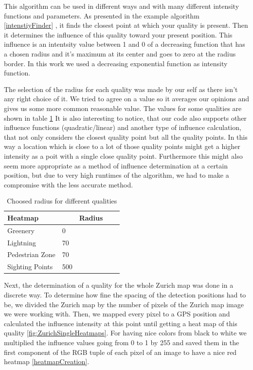 \documentclass[letterpaper]{article}
\begin{document}
\indent This algorithm can be used in different ways and with many different intensity functions and parameters. As presented in the example algorithm \ref{intenstiyFinder} , it finds the closest point at which your quality is present. Then it determines the influence of this quality toward your present position. This influence is an intentsity value between 1 and 0 of a decreasing function that has a chosen radius and it's maximum at its center and goes to zero at the radius border. In this work we used a decreasing exponential function as intensity function.

\indent The selection of the radius for each quality was made by our self as there isn't any right choice of it. We tried to agree on a value so it averages our opinions and gives us some more common reasonable value. The values for some qualities are shown in table \ref{table:RadiusParam} It is also interesting to notice, that our code also supports other influence functions (quadratic/linear) and another type of influence calculation, that not only considers the closest quality point but all the quality points. In this way a location which is close to a lot of those quality points might get a higher intensity as a poit with a single close quality point. Furthermore this might also seem more appropriate as a method of influence determination at a certain position, but due to very high runtimes of the algorithm, we had to make a compromise with the less accurate method.

\begin{table}[]
\centering
\caption{Choosed radius for different qualities}
\label{table:RadiusParam}
\begin{tabular}{lllll}
Heatmap     &          & Radius  \\
\hline
Greenery &  0 \\
Lightning       & 70 \\
Pedestrian Zone          & 70  \\
Sighting Points     & 500   \\
\end{tabular}
\end{table}

\indent Next, the determination of a quality for the whole Zurich map was done in a discrete way. To determine how fine the spacing of the detection positions had to be, we divided the Zurich map by the number of pixels of the Zurich map image we were working with. Then, we mapped every pixel to a GPS position and calculated the influence intensity at this point until getting a heat map of this quality \ref{fig:ZurichSingleHeatmaps}. For having nice colors from black to white we multiplied the influence values going from 0 to 1 by 255 and saved them in the first component of the RGB tuple of each pixel of an image to have a nice red heatmap \ref{heatmapCreation}.
\end{document}
